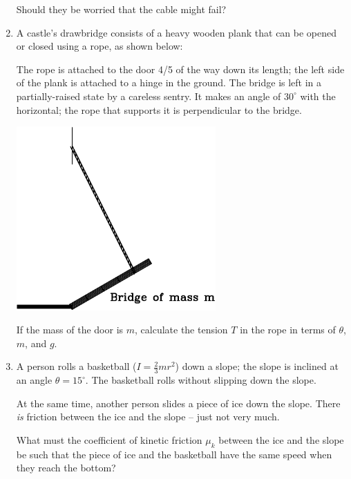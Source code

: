 \documentclass[12pt]{article}
\begin{document}
\begin{enumerate}
	Should they be worried that the cable might fail?
	
	\bigskip
	\bigskip
	\item A castle's drawbridge consists of a heavy wooden plank that can be opened or closed using a rope, as shown below:
	
	\begin{minipage}{0.5\textwidth}
		The rope is attached to the door 4/5 of the way down its length; the left side of the plank is attached to a hinge
		in the ground.
		The bridge is left in a partially-raised state by a careless sentry. It makes an angle of $30^\circ$ with the horizontal; the rope that supports it is perpendicular to the
		bridge.
	\end{minipage}
	\begin{minipage}{0.5\textwidth}
		\begin{center}
			\includegraphics[width=0.6\textwidth]{door-crop.pdf}
		\end{center}
		
	\end{minipage}
	\medskip
	
	If the mass of the door is $m$, calculate the tension $T$ in the rope in terms of $\theta$, $m$, and $g$.
	
		\bigskip
	

\item A person rolls a basketball ($I=\frac{2}{3}mr^2$) down a slope; the slope is inclined at an angle $\theta=15^\circ$. The basketball rolls without slipping down the slope.

At the same time, another person slides a piece of ice down the slope. There {\it is} friction between the ice and the slope -- just not very much.

What must the coefficient of kinetic friction $\mu_k$ between the ice and the slope be such that the piece of ice and the basketball have the same speed when they reach the bottom?


\end{enumerate}
\end{document}
